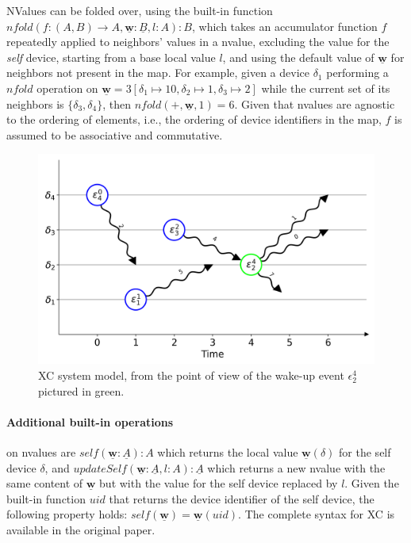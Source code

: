 NValues can be folded over, using the built-in function $nfold(f : (A, B) \rightarrow A, \underline{\mathbf{w}} : \underline{B}, l : A) : B$, which takes an accumulator function $f$ repeatedly applied to neighbors' values in a nvalue, excluding the value for the \textit{self} device, starting from a base local value $l$, and using the default value of $\underline{\mathbf{w}}$ for neighbors not present in the map\cite{xc}.
%
For example, given a device $\delta_1$ performing a $nfold$ operation on $\underline{\mathbf{w}} = 3[\delta_1 \mapsto 10, \delta_2 \mapsto 1, \delta_3 \mapsto 2]$ while the current set of its neighbors is $\{\delta_3, \delta_4\}$, then $nfold(+, \underline{\mathbf{w}}, 1) = 6$.
%
Given that nvalues are agnostic to the ordering of elements, i.e., the ordering of device identifiers in the map, $f$ is assumed to be associative and commutative\cite{xc}.

\begin{figure}
    \centering
    \includegraphics[width=.8\linewidth]{figures/nvalues-example.png}
    \caption{\ac{XC} system model, from the point of view of the wake-up event $\epsilon_2^4$ pictured in green.}
    \label{fig:xc-nvalues-exampke}
\end{figure}

\paragraph{Additional built-in operations} on nvalues are $self(\underline{\mathbf{w}} : \underline{A}) : A$ which returns the local value $\underline{\mathbf{w}}(\delta)$ for the self device $\delta$, and $updateSelf(\underline{\mathbf{w}} : \underline{A}, l : A) : \underline{A}$ which returns a new nvalue with the same content of $\underline{\mathbf{w}}$ but with the value for the self device replaced by $l$\cite{xc}.
%
Given the built-in function $uid$ that returns the device identifier of the self device, the following property holds: $self(\underline{\mathbf{w}}) = \underline{\mathbf{w}}(uid)$.
%
The complete syntax for \ac{XC} is available in the original paper\cite[p. 4]{xc}.

